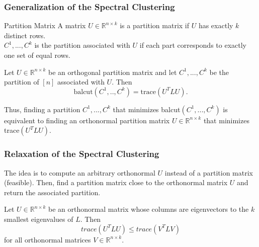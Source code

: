 \documentclass[english]{panikzettel}
\begin{document}
\subsubsection{Generalization of the Spectral Clustering}
\begin{halfboxl}
\vspace{-\baselineskip}
	\begin{defi}{Partition Matrix}
	A matrix $U\in\mathbb{R}^{n\times k}$ is a partition matrix if $U$ has exactly $k$ distinct rows.\\
	$C^1,...,C^k$ is the partition associated with $U$ if each part corresponds to exactly one set of equal rows.
	\end{defi}
\end{halfboxl}
\begin{halfboxr}
\vspace{-\baselineskip}
	\begin{theo}{}
	Let $U\in \mathbb{R}^{n\times k}$ be an orthogonal partition matrix and let $C^1,...,C^k$ be the partition of $[n]$ associated with $U$. Then
	\[
	\text{balcut}(C^1,..,C^k)=\text{trace}(U^TLU).
	\]
	\end{theo}
\end{halfboxr}
Thus, finding a partition $C^1,...,C^k$ that minimizes balcut$(C^1,...,C^k)$ is equivalent to finding an orthonormal partition matrix $U\in\mathbb{R}^{n\times k}$ that minimizes trace$(U^TLU)$.

\subsubsection{Relaxation of the Spectral Clustering}

The idea is to compute an arbitrary orthonormal $U$ instead of a partition matrix (feasible).
Then, find a partition matrix close to the orthonormal matrix $U$ and return the associated partition.

\begin{theo}{}
Let $U\in\mathbb{R}^{n\times k}$ be an orthonormal matrix whose columns are eigenvectors to the $k$ smallest eigenvalues of $L$. Then
\[
trace(U^TLU)\leq trace(V^TLV)
\]
for all orthonormal matrices $V\in \mathbb{R}^{n\times k}$.
\end{theo}


\end{document}
